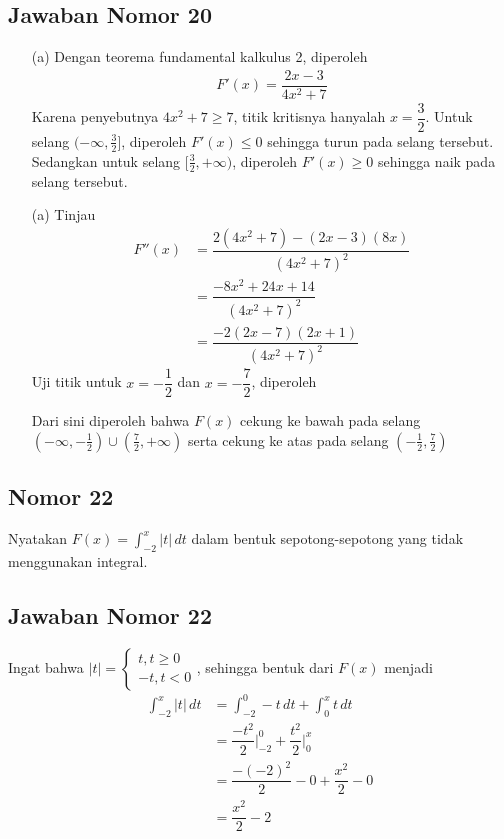 \documentclass{article}
\begin{document}
\subsection*{Jawaban Nomor 20}
	\begin{enumerate}
		\item[(a)] Dengan teorema fundamental kalkulus 2, diperoleh 
		\begin{align*}
		F'(x) = \dfrac{2x-3}{4x^2+7}
		\end{align*}
		Karena penyebutnya $4x^2+7\geq 7$, titik kritisnya hanyalah $x=\dfrac{3}{2}$. Untuk selang $(-\infty,\frac{3}{2}]$, diperoleh $F'(x)\leq 0$ sehingga turun pada selang tersebut. Sedangkan untuk selang $[\frac{3}{2},+\infty)$, diperoleh $F'(x)\geq 0$ sehingga naik pada selang tersebut.
		\item[(a)] Tinjau 
		\begin{align*}
		F''(x) &= \dfrac{2(4x^2+7)-(2x-3)(8x)}{(4x^2+7)^2}\\
		&= \dfrac{-8x^2+24x+14}{(4x^2+7)^2}\\
		&= \dfrac{-2(2x-7)(2x+1)}{(4x^2+7)^2}
		\end{align*}
		Uji titik untuk $x=-\dfrac{1}{2}$ dan $x=-\dfrac{7}{2}$, diperoleh
		\begin{center}
		\end{center}
		Dari sini diperoleh bahwa $F(x)$ cekung ke bawah pada selang $(-\infty,-\frac{1}{2})\cup (\frac{7}{2},+\infty)$ serta cekung ke atas pada selang $(-\frac{1}{2},\frac{7}{2})$
	\end{enumerate}
\subsection*{Nomor 22}
Nyatakan $F(x)=\displaystyle\int_{-2}^x |t|\, dt$ dalam bentuk sepotong-sepotong yang tidak menggunakan integral.
\subsection*{Jawaban Nomor 22}
Ingat bahwa $|t|=\begin{cases}t, t\geq 0\\ -t, t<0\end{cases}$, sehingga bentuk dari $F(x)$ menjadi 
\begin{align*}
\int_{-2}^x |t|\, dt &= \int_{-2}^0 -t \, dt + \int_0^x t \, dt\\
&= \dfrac{-t^2}{2}\bigg|^0_{-2} + \dfrac{t^2}{2}\bigg|^x_0\\
&= \dfrac{-(-2)^2}{2}-0+\dfrac{x^2}{2}-0\\
&= \dfrac{x^2}{2}-2
\end{align*}
\end{document}
